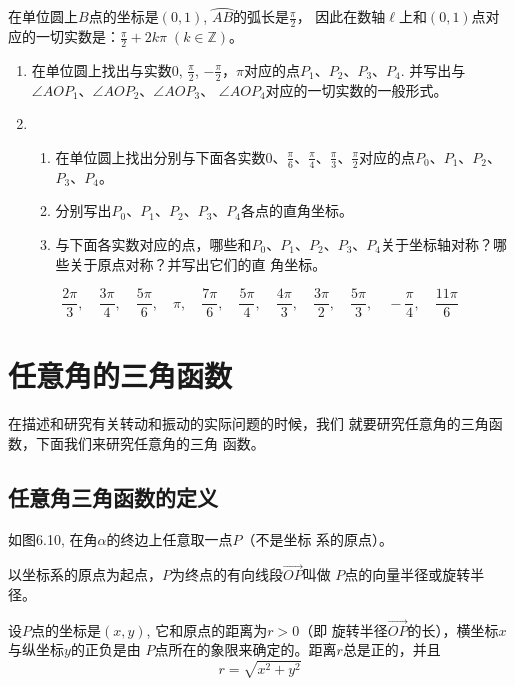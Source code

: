 \begin{solution}
在单位圆上$B$点的坐标是$(0,1)$, $\wideparen{AB}$的弧长是$\frac{\pi}{2}$，
因此在数轴$\ell$上和$(0,1)$点对应的一切实数是：$\frac{\pi}{2}+2k\pi\; (k\in\mathbb{Z})$。

\end{solution}

\begin{ex}
\begin{enumerate}
   \item 在单位圆上找出与实数0, $\frac{\pi}{2}$, $-\frac{\pi}{2}$，$\pi$对应的点$P_1$、$P_2$、$P_3$、$P_4$. 并写出与$\angle AOP_1$、$\angle AOP_2$、$\angle AOP_3$、
$\angle AOP_4$对应的一切实数的一般形式。


\item \begin{enumerate}
\item 在单位圆上找出分别与下面各实数0、$\frac{\pi}{6}$、$\frac{\pi}{4}$、$\frac{\pi}{3}$、$\frac{\pi}{2}$对应的点$P_0$、$P_1$、$P_2$、$P_3$、$P_4$。
\item 分别写出$P_0$、$P_1$、$P_2$、$P_3$、$P_4$各点的直角坐标。
\item 与下面各实数对应的点，哪些和$P_0$、$P_1$、$P_2$、$P_3$、$P_4$关于坐标轴对称？哪些关于原点对称？并写出它们的直
角坐标。
\end{enumerate} 
\end{enumerate}
\[\frac{2\pi}{3},\quad \frac{3\pi}{4},\quad \frac{5\pi}{6},\quad \pi,\quad \frac{7\pi}{6},\quad \frac{5\pi}{4},\quad \frac{4\pi}{3},\quad \frac{3\pi}{2},\quad \frac{5\pi}{3},\quad -\frac{\pi}{4},\quad \frac{11\pi}{6}\]
\end{ex}

\section{任意角的三角函数}
在描述和研究有关转动和振动的实际问题的时候，我们
就要研究任意角的三角函数，下面我们来研究任意角的三角
函数。

\subsection{任意角三角函数的定义}
如图6.10, 在角$\alpha$的终边上任意取一点$P$（不是坐标
系的原点）。

以坐标系的原点为起点，$P$为终点的有向线段$\Vec{OP}$叫做
$P$点的向量半径或旋转半径。

设$P$点的坐标是$(x,y)$, 它和原点的距离为$r>0$（即
旋转半径$\Vec{OP}$的长），横坐标$x$与纵坐标$y$的正负是由
$P$点所在的象限来确定的。距离$r$总是正的，并且
\[r=\sqrt{x^2+y^2}\]

